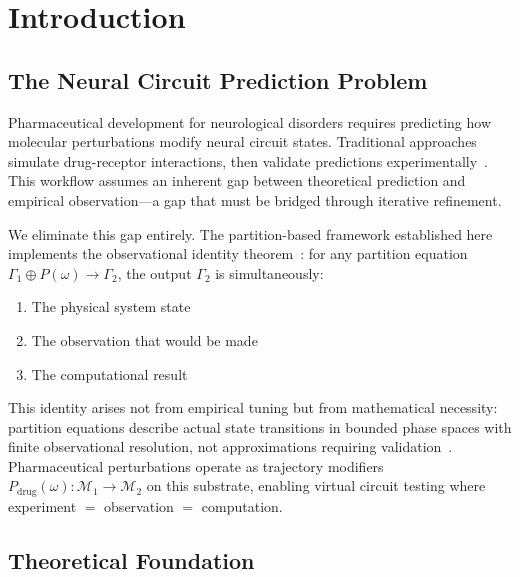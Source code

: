 \documentclass[aps,prd,twocolumn,superscriptaddress,floatfix,nofootinbib]{revtex4-2}
\theoremstyle{remark}
\begin{document}
\maketitle

\section{Introduction}
\label{sec:introduction}

\subsection{The Neural Circuit Prediction Problem}

Pharmaceutical development for neurological disorders requires predicting how molecular perturbations modify neural circuit states. Traditional approaches simulate drug-receptor interactions, then validate predictions experimentally~\cite{friston2010free}. This workflow assumes an inherent gap between theoretical prediction and empirical observation—a gap that must be bridged through iterative refinement.

We eliminate this gap entirely. The partition-based framework established here implements the observational identity theorem~\cite{sachikonye2024categorical,sachikonye2025observation}: for any partition equation $\Gamma_1 \oplus P(\omega) \to \Gamma_2$, the output $\Gamma_2$ is simultaneously:
\begin{enumerate}
\item[(P)] The physical system state
\item[(O)] The observation that would be made  
\item[(C)] The computational result
\end{enumerate}

This identity arises not from empirical tuning but from mathematical necessity: partition equations describe actual state transitions in bounded phase spaces with finite observational resolution, not approximations requiring validation~\cite{sachikonye2025partition}. Pharmaceutical perturbations operate as trajectory modifiers $P_{\text{drug}}(\omega): \mathcal{M}_1 \to \mathcal{M}_2$ on this substrate, enabling virtual circuit testing where experiment $=$ observation $=$ computation.

\subsection{Theoretical Foundation}
\end{document}
